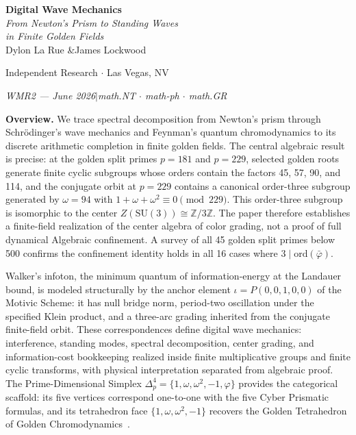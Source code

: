 \documentclass[12pt,oneside]{article}
\theoremstyle{principia}
\theoremstyle{definition}
\theoremstyle{remark}
\providecommand{\ZZ}{\mathbb{Z}}
\providecommand{\vp}{\varphi}
\providecommand{\vpbar}{\bar{\varphi}}
\begin{document}
\begin{center}
\vspace*{0.5em}
{\LARGE\bfseries Digital Wave Mechanics}\\[12pt]
{\large\itshape From Newton's Prism to Standing Waves\\
in Finite Golden Fields}\\[8pt]

\vspace{1.5em}
{\large Dylon La Rue \quad\&\quad James Lockwood}

\vspace{0.5em}
{\small Independent Research $\cdot$ Las Vegas, NV}

\vspace{0.5em}
{\small\itshape WMR2 --- June 2026\quad$|$\quad math.NT $\cdot$ math-ph $\cdot$ math.GR}
\end{center}

\vspace{1em}

\vspace{1em}\noindent\textbf{Overview.}
We trace spectral decomposition from Newton's prism through Schr\"odinger's wave mechanics and Feynman's quantum chromodynamics to its discrete arithmetic completion in finite golden fields. The central algebraic result is precise: at the golden split primes $p = 181$ and $p = 229$, selected golden roots generate finite cyclic subgroups whose orders contain the factors 45, 57, 90, and 114, and the conjugate orbit at $p = 229$ contains a canonical order-three subgroup generated by $\omega = 94$ with $1 + \omega + \omega^2 \equiv 0 \pmod{229}$. This order-three subgroup is isomorphic to the center $Z(\mathrm{SU}(3)) \cong \ZZ/3\ZZ$. The paper therefore establishes a finite-field realization of the center algebra of color grading, not a proof of full dynamical Algebraic confinement. A survey of all 45 golden split primes below 500 confirms the confinement identity holds in all 16 cases where $3 \mid \mathrm{ord}(\vpbar)$.

Walker's infoton, the minimum quantum of information-energy at the Landauer bound, is modeled structurally by the anchor element $\iota = P(0,0,1,0,0)$ of the Motivic Scheme: it has null bridge norm, period-two oscillation under the specified Klein product, and a three-arc grading inherited from the conjugate finite-field orbit. These correspondences define digital wave mechanics: interference, standing modes, spectral decomposition, center grading, and information-cost bookkeeping realized inside finite multiplicative groups and finite cyclic transforms, with physical interpretation separated from algebraic proof. The Prime-Dimensional Simplex $\Delta^4_p = \{1, \omega, \omega^2, -1, \vp\}$ provides the categorical scaffold: its five vertices correspond one-to-one with the five Cyber Prismatic formulas, and its tetrahedron face $\{1, \omega, \omega^2, -1\}$ recovers the Golden Tetrahedron of Golden Chromodynamics~\cite{larue_chromatic}.
\vspace{1em}
\end{document}
